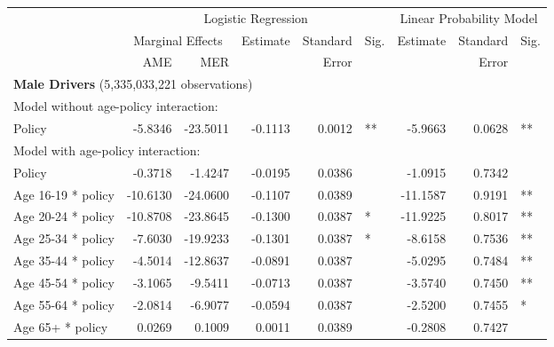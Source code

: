 \documentclass{cje}
\begin{document}
\begin{table}%
\centering 
\begin{tabular}{l r r r r l r r l} 

\hline 
 
 & \multicolumn{5}{c}{Logistic Regression}  & \multicolumn{3}{c}{Linear Probability Model} \\ 

 \cmidrule(lr){2-6}\cmidrule(lr){7-9} 
 & \multicolumn{2}{c}{Marginal Effects} & Estimate & Standard & Sig. & Estimate & Standard & Sig. \\ 

 \cmidrule(lr){2-3} 
 &   AME &  MER  &          &  Error   &      &          &  Error   &     \\ 

\hline 
 
\multicolumn{8}{l}{\textbf{Male Drivers} (5,335,033,221 observations)} \\ 

\hline
\multicolumn{8}{l}{Model without age-policy interaction: } \\ 
Policy                   &  -5.8346        &  -23.5011       &  -0.1113        &  0.0012       &   **       &  -5.9663        &  0.0628       &   **       \\ 
\hline
\multicolumn{8}{l}{Model with age-policy interaction: } \\ 
Policy                   &  -0.3718        &  -1.4247       &  -0.0195        &  0.0386       &            &  -1.0915        &  0.7342       &            \\ 
Age 16-19 * policy   &  -10.6130        &  -24.0600       &  -0.1107        &  0.0389       &            &  -11.1587        &  0.9191       &   **       \\ 
Age 20-24 * policy   &  -10.8708        &  -23.8645       &  -0.1300        &  0.0387       &    *       &  -11.9225        &  0.8017       &   **       \\ 
Age 25-34 * policy   &  -7.6030        &  -19.9233       &  -0.1301        &  0.0387       &    *       &  -8.6158        &  0.7536       &   **       \\ 
Age 35-44 * policy   &  -4.5014        &  -12.8637       &  -0.0891        &  0.0387       &            &  -5.0295        &  0.7484       &   **       \\ 
Age 45-54 * policy   &  -3.1065        &  -9.5411       &  -0.0713        &  0.0387       &            &  -3.5740        &  0.7450       &   **       \\ 
Age 55-64 * policy   &  -2.0814        &  -6.9077       &  -0.0594        &  0.0387       &            &  -2.5200        &  0.7455       &    *       \\ 
Age 65+ * policy   &  0.0269        &  0.1009       &  0.0011        &  0.0389       &            &  -0.2808        &  0.7427       &            \\ 


\end{tabular}
\end{table}
\end{document}

